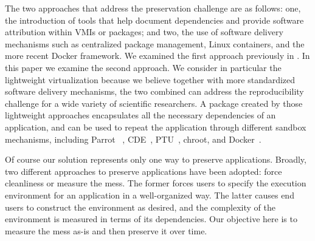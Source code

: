
The two approaches that address the preservation challenge are as follows: one, the introduction of tools that help document dependencies and provide software attribution within VMIs or packages; and two, the use of software delivery mechanisms such as centralized package management, Linux containers, and the more recent Docker framework. We examined the first approach previously in \cite{SoftProv}. 
In this paper we examine the second approach.  We consider in particular the lightweight virtualization because we believe together with more standardized software delivery mechanisms, the two combined can address the reproducibility challenge for a wide variety of scientific researchers. A package created by those lightweight approaches encapsulates all the necessary dependencies of an application, and can be used to repeat the application through different sandbox mechanisms, including Parrot
~\cite{thain2005parrot}, CDE~\cite{guo2011cde}, PTU~\cite{PTU}, chroot, and Docker~\cite{boettiger2015introduction}. 

Of course our solution represents only one way to preserve applications. Broadly, two different approaches to preserve applications have been adopted: force cleanliness or measure the mess. The former forces users to specify the execution environment for an application in a well-organized way. The latter causes end users to construct the environment as desired, and the complexity of the environment is measured in terms of its dependencies. Our objective here is to measure the mess as-is and then preserve it over time.



